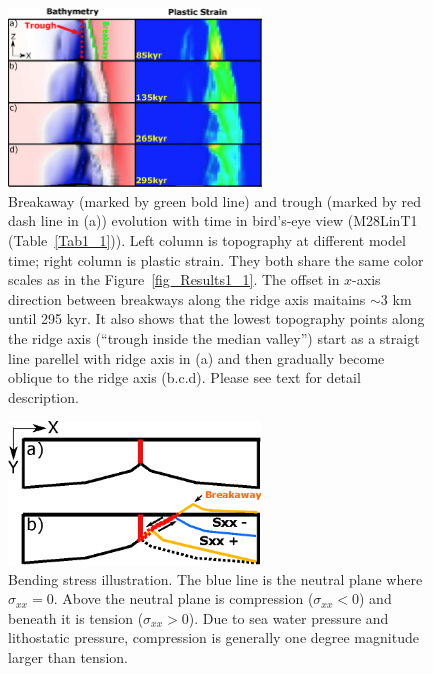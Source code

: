 \begin{figure}[h]
  \centering
    \includegraphics[width=0.6\textwidth]{./Figures/fig_Results1_4.eps}
  \caption{Breakaway (marked by green bold line) and trough (marked by red dash line in (a)) evolution with time in bird's-eye view (M28LinT1 (Table~\hyperref[Tab1_1]{\ref{Tab1_1}})). Left column is topography at different model time; right column is plastic strain. They both share the same color scales as in the Figure~\hyperref[fig_Results1_1]{\ref{fig_Results1_1}}. The offset in $x$-axis direction between breakways along the ridge axis maitains $\sim$3 km until 295 kyr. It also shows that the lowest topography points along the ridge axis (``trough inside the median valley'') start as a straigt line parellel with ridge axis in (a) and then gradually become oblique to the ridge axis (b.c.d). Please see text for detail description.}
 \label{fig_Results1_4}
\end{figure}

\begin{figure}[h]
  \centering
    \includegraphics[width=0.6\textwidth]{./Figures/fig_Results4_8_sqrt_cut_back_bending_cartoon.eps}
  \caption{Bending stress illustration. The blue line is the neutral plane where $\sigma_{xx}=0$. Above the neutral plane is compression ($\sigma_{xx}<0$) and beneath it is tension ($\sigma_{xx}>0$). Due to sea water pressure and lithostatic pressure, compression is generally one degree magnitude larger than tension.}
 \label{fig_Results4_8}
\end{figure}

